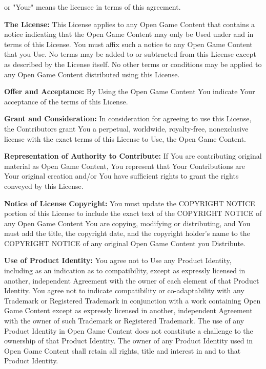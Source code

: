 \documentclass[letterpaper, 12pt, twocolumn]{article}
\begin{document}
\begin{footnotesize}
{or "Your" means the licensee in terms of this 
agreement.
\item \textbf{The License:} This License applies to any Open 
Game Content that contains a notice indicating that 
the Open Game Content may only be Used under and 
in terms of this License. You must affix such a notice 
to any Open Game Content that you Use. No terms 
may be added to or subtracted from this License 
except as described by the License itself. No other 
terms or conditions may be applied to any Open 
Game Content distributed using this License.
\item \textbf{Offer and Acceptance:} By Using the Open Game 
Content You indicate Your acceptance of the terms of 
this License.
\item \textbf{Grant and Consideration:} In consideration for 
agreeing to use this License, the Contributors grant 
You a perpetual, worldwide, royalty-free, nonexclusive license with the exact terms of this License 
to Use, the Open Game Content.
\item \textbf{Representation of Authority to Contribute:} If You 
are contributing original material as Open Game 
Content, You represent that Your Contributions are 
Your original creation and/or You have sufficient 
rights to grant the rights conveyed by this License.
\item \textbf{Notice of License Copyright:} You must update the 
COPYRIGHT NOTICE portion of this License to 
include the exact text of the COPYRIGHT NOTICE of 
any Open Game Content You are copying, modifying 
or distributing, and You must add the title, the 
copyright date, and the copyright holder's name to 
the COPYRIGHT NOTICE of any original Open Game 
Content you Distribute.
\item \textbf{Use of Product Identity:} You agree not to Use any 
Product Identity, including as an indication as to 
compatibility, except as expressly licensed in 
another, independent Agreement with the owner of 
each element of that Product Identity. You agree not 
to indicate compatibility or co-adaptability with any 
Trademark or Registered Trademark in conjunction 
with a work containing Open Game Content except 
as expressly licensed in another, independent 
Agreement with the owner of such Trademark or 
Registered Trademark. The use of any Product 
Identity in Open Game Content does not constitute a 
challenge to the ownership of that Product Identity. 
The owner of any Product Identity used in Open 
Game Content shall retain all rights, title and interest 
in and to that Product Identity.
}
\end{footnotesize}
\end{document}
